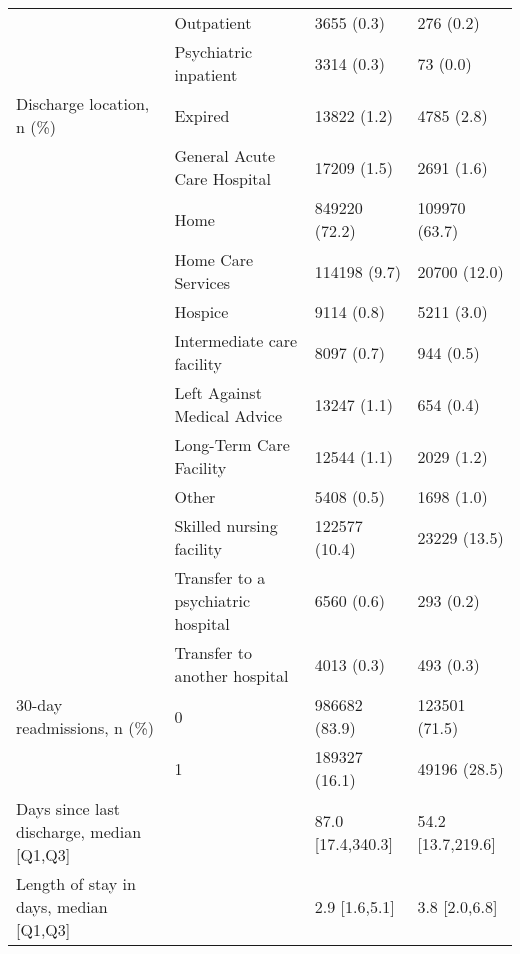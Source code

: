 \begin{tabular}{llll}
                                       & Outpatient &         3655 (0.3) &          276 (0.2) \\
                                       & Psychiatric inpatient &         3314 (0.3) &           73 (0.0) \\
Discharge location, n (\%) & Expired &        13822 (1.2) &         4785 (2.8) \\
                                       & General Acute Care Hospital &        17209 (1.5) &         2691 (1.6) \\
                                       & Home &      849220 (72.2) &      109970 (63.7) \\
                                       & Home Care Services &       114198 (9.7) &       20700 (12.0) \\
                                       & Hospice &         9114 (0.8) &         5211 (3.0) \\
                                       & Intermediate care facility &         8097 (0.7) &          944 (0.5) \\
                                       & Left Against Medical Advice &        13247 (1.1) &          654 (0.4) \\
                                       & Long-Term Care Facility &        12544 (1.1) &         2029 (1.2) \\
                                       & Other &         5408 (0.5) &         1698 (1.0) \\
                                       & Skilled nursing facility &      122577 (10.4) &       23229 (13.5) \\
                                       & Transfer to a psychiatric hospital &         6560 (0.6) &          293 (0.2) \\
                                       & Transfer to another hospital &         4013 (0.3) &          493 (0.3) \\
30-day readmissions, n (\%) & 0 &      986682 (83.9) &      123501 (71.5) \\
                                       & 1 &      189327 (16.1) &       49196 (28.5) \\
Days since last discharge, median [Q1,Q3] &   &  87.0 [17.4,340.3] &  54.2 [13.7,219.6] \\
Length of stay in days, median [Q1,Q3] &   &      2.9 [1.6,5.1] &      3.8 [2.0,6.8] \\
\bottomrule
\end{tabular}
